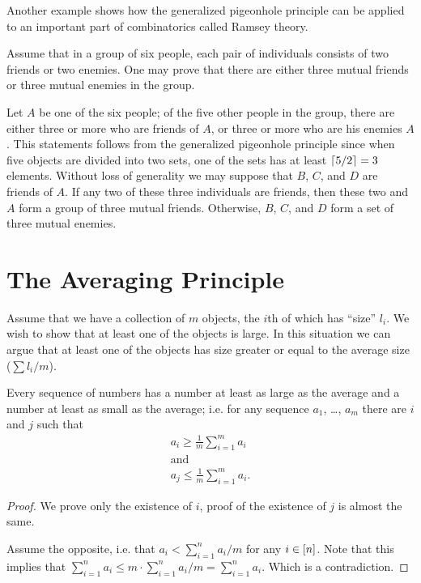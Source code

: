 Another example shows how the generalized pigeonhole principle can be applied
to an important part of combinatorics called Ramsey theory.

Assume that in a group of six people, each pair of individuals consists of two
friends or two enemies. One may prove that there are either three mutual
friends or three mutual enemies in the group.

Let $A$ be one of the six people; of the five other people in the group, there
are either three or more who are friends of $A$, or three or more who are
his enemies $A$. This statements follows from the generalized pigeonhole
principle since when five objects are divided into two sets, one of the sets
has at least $\left\lceil {5 / 2} \right\rceil = 3$ elements. Without loss of generality we may
suppose that $B$, $C$, and $D$ are friends of $A$. If any two of these three
individuals are friends, then these two and $A$ form a group of three mutual
friends. Otherwise, $B$, $C$, and $D$ form a set of three mutual enemies.

\section{The Averaging Principle}
Assume that we have a collection of $m$ objects, the $i$th of which has
``size'' $l_i$. We wish to show that at least one of the objects is large.
In this situation we can argue that at least one of the objects has size
greater or equal to the average size ($\sum l_i / m$).
\begin{theorem}
\label{theorem:averaging-principle}
  Every sequence of numbers has a number at least as large as the average and a
  number at least as small as the average; i.e. for any sequence $a_1$, \dots,
  $a_m$ there are $i$ and $j$ such that
  \begin{gather*}
    a_i \ge \frac{1}{m} \sum_{i = 1}^m a_i \\
    \text{and} \\
    a_j \le \frac{1}{m} \sum_{i = 1}^m a_i.
  \end{gather*}
\end{theorem}
\begin{proof}
  We prove only the existence of $i$, proof of the existence of $j$ is almost
  the same.

  Assume the opposite, i.e. that $a_i < \sum_{i = 1}^n a_i / m$
  for any $i \in {[{n}]}$. Note that this implies that
  $\sum_{i = 1}^n a_i \le m \cdot \sum_{i = 1}^n a_i / m = \sum_{i = 1}^n a_i$.
  Which is a contradiction.
\end{proof}

